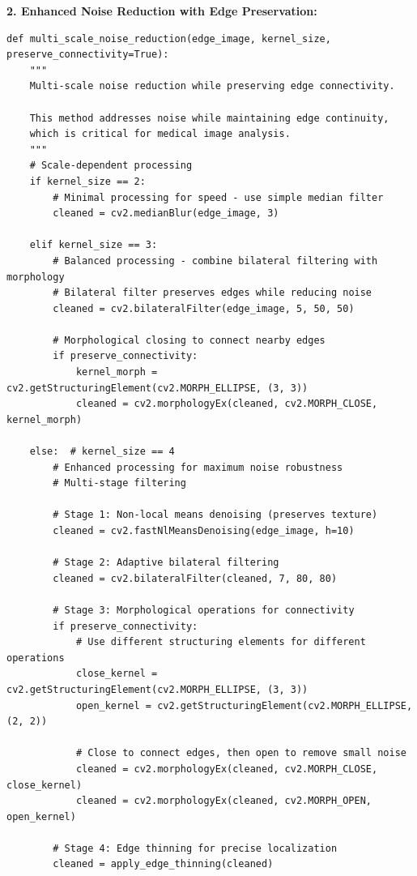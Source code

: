 \documentclass[conference]{IEEEtran}
\begin{document}
\textbf{2. Enhanced Noise Reduction with Edge Preservation:}
\begin{lstlisting}[caption={Multi-scale noise reduction with edge preservation}]
def multi_scale_noise_reduction(edge_image, kernel_size, preserve_connectivity=True):
    """
    Multi-scale noise reduction while preserving edge connectivity.
    
    This method addresses noise while maintaining edge continuity,
    which is critical for medical image analysis.
    """
    # Scale-dependent processing
    if kernel_size == 2:
        # Minimal processing for speed - use simple median filter
        cleaned = cv2.medianBlur(edge_image, 3)
        
    elif kernel_size == 3:
        # Balanced processing - combine bilateral filtering with morphology
        # Bilateral filter preserves edges while reducing noise
        cleaned = cv2.bilateralFilter(edge_image, 5, 50, 50)
        
        # Morphological closing to connect nearby edges
        if preserve_connectivity:
            kernel_morph = cv2.getStructuringElement(cv2.MORPH_ELLIPSE, (3, 3))
            cleaned = cv2.morphologyEx(cleaned, cv2.MORPH_CLOSE, kernel_morph)
        
    else:  # kernel_size == 4
        # Enhanced processing for maximum noise robustness
        # Multi-stage filtering
        
        # Stage 1: Non-local means denoising (preserves texture)
        cleaned = cv2.fastNlMeansDenoising(edge_image, h=10)
        
        # Stage 2: Adaptive bilateral filtering
        cleaned = cv2.bilateralFilter(cleaned, 7, 80, 80)
        
        # Stage 3: Morphological operations for connectivity
        if preserve_connectivity:
            # Use different structuring elements for different operations
            close_kernel = cv2.getStructuringElement(cv2.MORPH_ELLIPSE, (3, 3))
            open_kernel = cv2.getStructuringElement(cv2.MORPH_ELLIPSE, (2, 2))
            
            # Close to connect edges, then open to remove small noise
            cleaned = cv2.morphologyEx(cleaned, cv2.MORPH_CLOSE, close_kernel)
            cleaned = cv2.morphologyEx(cleaned, cv2.MORPH_OPEN, open_kernel)
        
        # Stage 4: Edge thinning for precise localization
        cleaned = apply_edge_thinning(cleaned)
    

\end{lstlisting}
\end{document}
